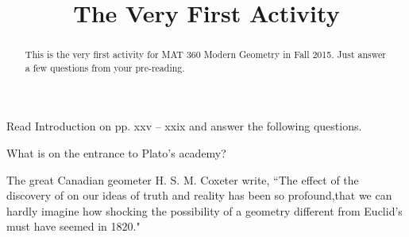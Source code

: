 \documentclass{ximera}
\title{The Very First Activity}
\begin{document}
\begin{abstract}
This is the very first activity for MAT 360 Modern Geometry in Fall 2015. Just answer a few questions from your pre-reading. 
\end{abstract}

\maketitle

Read Introduction on pp. xxv -- xxix and answer the following questions.

\bigskip
 
\begin{free-response}

 What is on the entrance to Plato's academy?

\end{free-response}


\bigskip

\begin{question}

The great Canadian geometer H. S. M. Coxeter write, 
``The effect of the discovery of \underline{\hspace{2.5cm}} \underline{\hspace{2cm}} %
on our ideas of truth and  reality has been so profound,that we can hardly imagine how shocking the possibility of a geometry different from Euclid's must have seemed in 1820."

\end{question}

\vspace{2cm}
\end{document}
